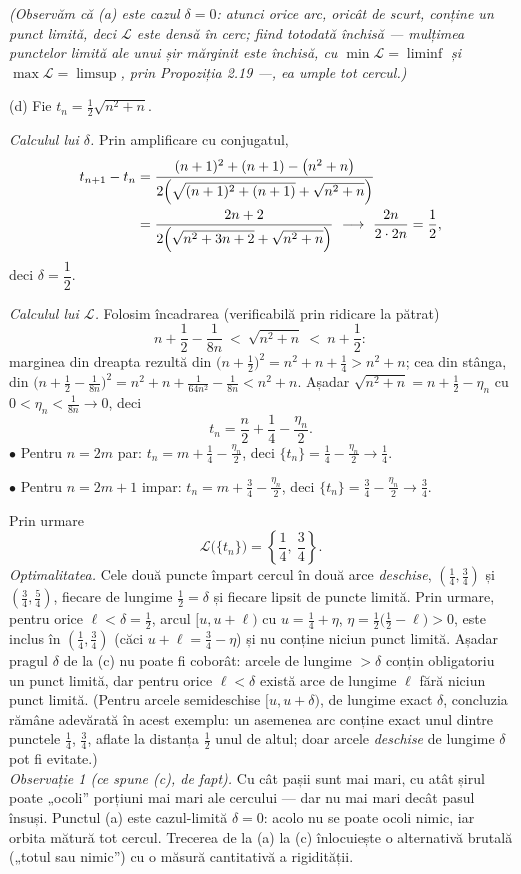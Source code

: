 \emph{(Observăm că (a) este cazul $\delta=0$: atunci orice arc, oricât de scurt, conține un punct limită, deci $\mathcal{L}$ este densă în cerc; fiind totodată \emph{închisă} --- mulțimea punctelor limită ale unui șir mărginit este închisă, cu $\min\mathcal{L}=\liminf$ și $\max\mathcal{L}=\limsup$, prin Propoziția 2.19 ---, ea umple tot cercul.)}

(d) Fie $t_n=\frac12\sqrt{n^{2}+n}$.

\emph{Calculul lui $\delta$.} Prin amplificare cu conjugatul,
\[ \begin{aligned} t_{n+1}-t_n&=\frac{(n+1)^{2}+(n+1)-\bigl(n^{2}+n\bigr)}{2\Bigl(\sqrt{(n+1)^{2}+(n+1)}+\sqrt{n^{2}+n}\Bigr)}\\ &=\frac{2n+2}{2\Bigl(\sqrt{n^{2}+3n+2}+\sqrt{n^{2}+n}\Bigr)}\ \longrightarrow\ \frac{2n}{2\cdot2n}=\frac12 , \end{aligned} \]
deci $\delta=\dfrac12$.

\emph{Calculul lui $\mathcal{L}$.} Folosim încadrarea (verificabilă prin ridicare la pătrat)
\[ n+\frac12-\frac{1}{8n}\ <\ \sqrt{n^{2}+n}\ <\ n+\frac12 : \]
marginea din dreapta rezultă din $\bigl(n+\frac12\bigr)^{2}=n^{2}+n+\frac14>n^{2}+n$; cea din stânga, din
$\bigl(n+\frac12-\frac1{8n}\bigr)^{2}=n^{2}+n+\frac{1}{64n^{2}}-\frac{1}{8n}<n^{2}+n$.
Așadar $\sqrt{n^{2}+n}=n+\frac12-\eta_n$ cu $0<\eta_n<\frac1{8n}\to0$, deci
\[ t_n=\frac n2+\frac14-\frac{\eta_n}{2} . \]
$\bullet$ Pentru $n=2m$ par: $t_n=m+\frac14-\frac{\eta_n}{2}$, deci $\{t_n\}=\frac14-\frac{\eta_n}{2}\to\frac14$.

$\bullet$ Pentru $n=2m+1$ impar: $t_n=m+\frac34-\frac{\eta_n}{2}$, deci $\{t_n\}=\frac34-\frac{\eta_n}{2}\to\frac34$.

Prin urmare
\[ \mathcal{L}\bigl(\{t_n\}\bigr)=\left\{\frac14,\ \frac34\right\} . \]
\emph{Optimalitatea.} Cele două puncte împart cercul în două arce \emph{deschise}, $\left(\frac14,\frac34\right)$ și $\left(\frac34,\frac54\right)$, fiecare de lungime $\frac12=\delta$ și fiecare lipsit de puncte limită. Prin urmare, pentru orice $\ell<\delta=\frac12$, arcul $[u,u+\ell)$ cu $u=\frac14+\eta$, $\eta=\frac{1}{2}\bigl(\frac12-\ell\bigr)>0$, este inclus în $\left(\frac14,\frac34\right)$ (căci $u+\ell=\frac34-\eta$) și nu conține niciun punct limită. Așadar pragul $\delta$ de la (c) nu poate fi coborât: arcele de lungime $>\delta$ conțin obligatoriu un punct limită, dar pentru orice $\ell<\delta$ există arce de lungime $\ell$ fără niciun punct limită. (Pentru arcele semideschise $[u,u+\delta)$, de lungime exact $\delta$, concluzia rămâne adevărată în acest exemplu: un asemenea arc conține exact unul dintre punctele $\frac14$, $\frac34$, aflate la distanța $\frac12$ unul de altul; doar arcele \emph{deschise} de lungime $\delta$ pot fi evitate.)\\[2pt]
\emph{Observație 1 (ce spune (c), de fapt).} Cu cât pașii sunt mai mari, cu atât șirul poate „ocoli'' porțiuni mai mari ale cercului --- dar nu mai mari decât pasul însuși. Punctul (a) este cazul-limită $\delta=0$: acolo nu se poate ocoli nimic, iar orbita mătură tot cercul. Trecerea de la (a) la (c) înlocuiește o alternativă brutală („totul sau nimic'') cu o măsură cantitativă a rigidității.

